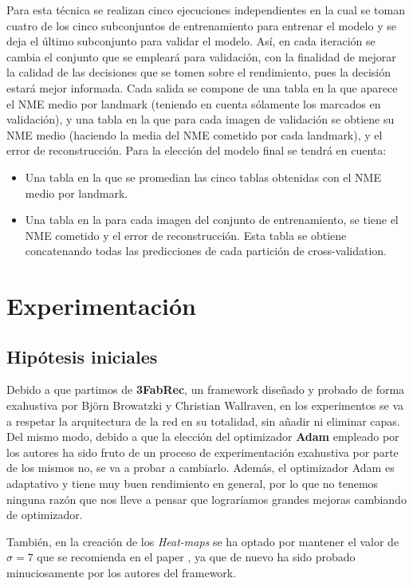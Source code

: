         \noindent Para esta técnica se realizan cinco ejecuciones independientes en la cual se toman cuatro de los cinco subconjuntos de entrenamiento para entrenar el modelo y se deja el último subconjunto para validar el modelo. Así, en cada iteración se cambia el conjunto que se empleará para validación, con la finalidad de mejorar la calidad de las decisiones que se tomen sobre el rendimiento, pues la decisión estará mejor informada. Cada salida se compone de una tabla en la que aparece el NME medio por landmark (teniendo en cuenta sólamente los marcados en validación), y una tabla en la que para cada imagen de validación se obtiene su NME medio (haciendo la media del NME cometido por cada landmark), y el error de reconstrucción. Para la elección del modelo final se tendrá en cuenta: 

        \begin{itemize}
            \item Una tabla en la que se promedian las cinco tablas obtenidas con el NME medio por landmark.
            \item Una tabla en la para cada imagen del conjunto de entrenamiento, se tiene el NME cometido y el error de reconstrucción. Esta tabla se obtiene concatenando todas las predicciones de cada partición de cross-validation.
        \end{itemize}


\section{Experimentación}
    \subsection{Hipótesis iniciales}
        \noindent Debido a que partimos de \textbf{3FabRec}, un framework diseñado y probado de forma exahustiva por Björn Browatzki y Christian Wallraven, en los experimentos se va a respetar la arquitectura de la red en su totalidad, sin añadir ni eliminar capas. Del mismo modo, debido a que la elección del optimizador \textbf{Adam} empleado por los autores ha sido fruto de un proceso de experimentación exahustiva por parte de los mismos no, se va a probar a cambiarlo. Además, el optimizador Adam es adaptativo y tiene muy buen rendimiento en general, por lo que no tenemos ninguna razón que nos lleve a pensar que lograríamos grandes mejoras cambiando de optimizador.

        \medskip

        \noindent También, en la creación de los \textit{Heat-maps} se ha optado por mantener el valor de $\sigma =7$ que se recomienda en el paper \cite{browatzki20203fabrec}, ya que de nuevo ha sido probado minuciosamente por los autores del framework.
    
